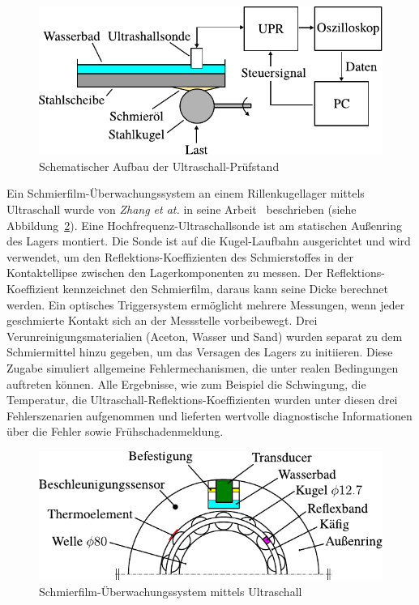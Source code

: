 \begin{figure}[htb]
    \centering
    \includegraphics[]{./images/ultrashall_pruefstand_dwyer-joyce.pdf}
    \caption{Schematischer Aufbau der Ultraschall-Prüfstand~\cite{dwyer-joyce_2011}}
    \label{fig:ultrashall_pruefstand_dwyer-joyce}
\end{figure}

Ein Schmierfilm-Überwachungssystem an einem Rillenkugellager mittels Ultraschall wurde von \textit{Zhang et at.} in seine Arbeit~\cite{zhang_2006} beschrieben (siehe Abbildung~\ref{fig:ultrashall_rikula_zhang}).
Eine Hochfrequenz-Ultraschallsonde ist am statischen Außenring des Lagers montiert.
Die Sonde ist auf die Kugel-Laufbahn ausgerichtet und wird verwendet, um den Reflektions-Koeffizienten des Schmierstoffes in der Kontaktellipse zwischen den Lagerkomponenten zu messen.
Der Reflektions-Koeffizient kennzeichnet den Schmierfilm, daraus kann seine Dicke berechnet werden.
Ein optisches Triggersystem ermöglicht mehrere Messungen, wenn jeder geschmierte Kontakt sich an der Messstelle vorbeibewegt.
Drei Verunreinigungsmaterialien (Aceton, Wasser und Sand) wurden separat zu dem Schmiermittel hinzu gegeben, um das Versagen des Lagers zu initiieren.
Diese Zugabe simuliert allgemeine Fehlermechanismen, die unter realen Bedingungen auftreten können.
Alle Ergebnisse, wie zum Beispiel die Schwingung, die Temperatur, die Ultraschall-Reflektions-Koeffizienten wurden unter diesen drei Fehlerszenarien aufgenommen und lieferten wertvolle diagnostische Informationen über die Fehler sowie Frühschadenmeldung.

\begin{figure}[htb]
    \centering
    \includegraphics[]{./images/ultrashall_rikula_zhang.pdf}
    \caption{Schmierfilm-Überwachungssystem mittels Ultraschall~\cite{zhang_2006}}
    \label{fig:ultrashall_rikula_zhang}
\end{figure}


